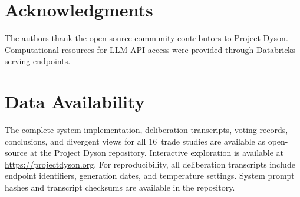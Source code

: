 \documentclass[11pt,a4paper]{article}
\begin{document}
\section*{Acknowledgments}

The authors thank the open-source community contributors to Project Dyson. Computational resources for LLM API access were provided through Databricks serving endpoints.

\section*{Data Availability}

The complete system implementation, deliberation transcripts, voting records, conclusions, and divergent views for all 16~trade studies are available as open-source at the Project Dyson repository. Interactive exploration is available at \url{https://projectdyson.org}. For reproducibility, all deliberation transcripts include endpoint identifiers, generation dates, and temperature settings. System prompt hashes and transcript checksums are available in the repository.
\end{document}
